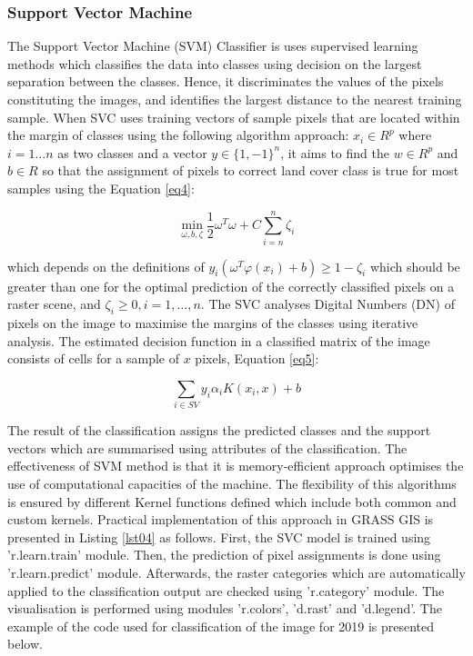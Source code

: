 \documentclass[jmse,article,submit,pdftex,moreauthors]{Definitions/mdpi}
\begin{document}
\subsubsection{Support Vector Machine}

The Support Vector Machine (SVM) Classifier is uses supervised learning methods \cite{Cortes} which classifies the data into classes using decision on the largest separation between the classes. Hence, it discriminates the values of the pixels constituting the images, and identifies the largest distance to the nearest training sample. When SVC uses training vectors of sample pixels that are located within the margin of classes using the following algorithm approach:
$x_{i} \in R^p$ where $ i=1 \dots n$ as two classes and a vector $y \in \{1, - 1\}^n$, it aims to find the $w \in R^p$ and $b \in R$ so that the assignment of pixels to correct land cover class is true for most samples using the Equation \ref{eq4}:

\begin{equation}
\min_{\omega,b,\zeta}\frac{1}{2}\omega^T\omega+C\sum_{i=n}^{n}\zeta_{i}
\label{eq4}
\end{equation}

which depends on the definitions of $y_{i}(\omega^{T}\varphi (x_i) + b)\geq 1-\zeta_{i}$ which should be greater than one for the optimal prediction of the correctly classified pixels on a raster scene, and $\zeta_{i}\geq 0, i = 1,\dots,n$. The SVC analyses Digital Numbers (DN) of pixels on the image to maximise the margins of the classes using iterative analysis. The estimated decision function in a classified matrix of the image consists of cells for a sample of $x$ pixels, Equation \ref{eq5}:

\begin{equation}
\sum_{i\in SV}y_{i}\alpha_{i}K(x_{i},x) + b
\label{eq5}
\end{equation}

The result of the classification assigns the predicted classes and the support vectors which are summarised using attributes of the classification. The effectiveness of SVM method is that it is memory-efficient approach optimises the use of computational capacities of the machine. The flexibility of this algorithms is ensured by different Kernel functions defined which include both common and custom kernels. Practical implementation of this approach in GRASS GIS is presented in Listing \ref{lst04} as follows. First, the SVC model is trained using 'r.learn.train' module. Then, the prediction of pixel assignments is done using 'r.learn.predict' module. Afterwards, the raster categories which are automatically applied to the classification output are checked using 'r.category' module. The visualisation is performed using modules 'r.colors', 'd.rast' and 'd.legend'. The example of the code used for classification of the image for 2019 is presented below. 
\end{document}
